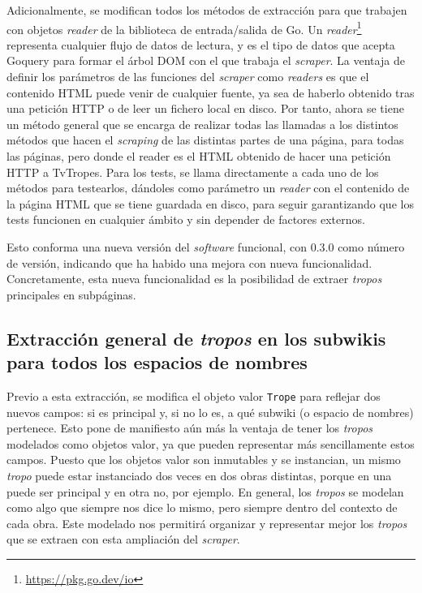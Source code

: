 Adicionalmente, se modifican todos los métodos de extracción para que trabajen
con objetos \textit{reader} de la biblioteca de entrada/salida de Go. Un
\textit{reader}\footnote{\url{https://pkg.go.dev/io}} representa cualquier flujo
de datos de lectura, y es el tipo de datos que acepta Goquery para formar el
árbol DOM con el que trabaja el \textit{scraper}. La ventaja de definir los
parámetros de las funciones del \textit{scraper} como \textit{readers} es que el
contenido HTML puede venir de cualquier fuente, ya sea de haberlo obtenido tras
una petición HTTP o de leer un fichero local en disco. Por tanto, ahora se tiene
un método general que se encarga de realizar todas las llamadas a los distintos
métodos que hacen el \textit{scraping} de las distintas partes de una página,
para todas las páginas, pero donde el reader es el HTML obtenido de hacer una
petición HTTP a TvTropes. Para los tests, se llama directamente a cada uno de
los métodos para testearlos, dándoles como parámetro un \textit{reader} con el
contenido de la página HTML que se tiene guardada en disco, para seguir
garantizando que los tests funcionen en cualquier ámbito y sin depender de
factores externos.

Esto conforma una nueva versión del \textit{software} funcional, con 0.3.0 como
número de versión, indicando que ha habido una mejora con nueva funcionalidad.
Concretamente, esta nueva funcionalidad es la posibilidad de extraer
\textit{tropos} principales en subpáginas.

\subsection{Extracción general de \textit{tropos} en los subwikis para todos los espacios de nombres}
Previo a esta extracción, se modifica el objeto valor \texttt{Trope} para
reflejar dos nuevos campos: si es principal y, si no lo es, a qué subwiki (o
espacio de nombres) pertenece. Esto pone de manifiesto aún más la ventaja de
tener los \textit{tropos} modelados como objetos valor, ya que pueden
representar más sencillamente estos campos. Puesto que los objetos valor son
inmutables y se instancian, un mismo \textit{tropo} puede estar instanciado dos
veces en dos obras distintas, porque en una puede ser principal y en otra no,
por ejemplo. En general, los \textit{tropos} se modelan como algo que siempre
nos dice lo mismo, pero siempre dentro del contexto de cada obra. Este modelado
nos permitirá organizar y representar mejor los \textit{tropos} que se extraen
con esta ampliación del \textit{scraper}.

